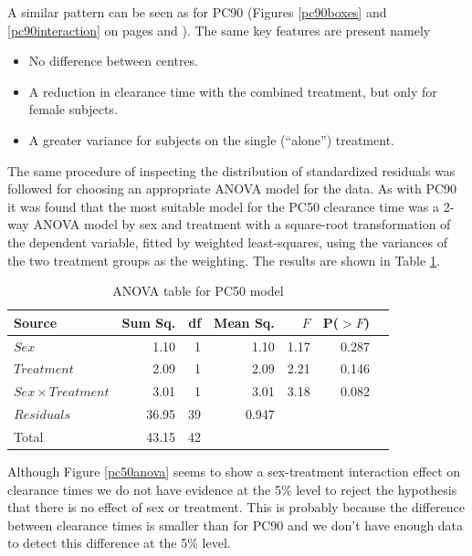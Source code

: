 A similar pattern can be seen as for PC90 (Figures \ref{pc90boxes} and \ref{pc90interaction} on pages \pageref{pc90boxes} and \pageref{pc90interaction}). The same key features are present namely
\begin{itemize}
\item No difference between centres.
\item A reduction in clearance time with the combined treatment, but only for female subjects.
\item A greater variance for subjects on the single (``alone'') treatment.
\end{itemize}

The same procedure of inspecting the distribution of standardized residuals was followed for choosing an appropriate ANOVA model for the data. As with PC90 it was found that the most suitable model for the PC50 clearance time was a 2-way ANOVA model by sex and treatment with a square-root transformation of the dependent variable, fitted by weighted least-squares, using the variances of the two treatment groups as the weighting. The results are shown in Table \ref{aov50}.
\begin{table}[h]
\centering
\caption{ANOVA table for PC50 model}\label{aov50}
\begin{tabular}{l|rrrrrl}
Source&Sum Sq.&df&Mean Sq.&$F$&P($>F$)\\
\hline
$Sex$				& 1.10 & 1 & 1.10 & 1.17 & 0.287 & \\
$Treatment$			& 2.09   & 1 & 2.09   & 2.21   & 0.146 & \\
$Sex\times Treatment$	& 3.01   & 1 & 3.01   & 3.18   & 0.082 & \\
$Residuals$			& 36.95 & 39 & 0.947 &&&\\
\hline
Total&43.15&42&&&
\end{tabular}
\end{table}

Although Figure \ref{pc50anova} seems to show a sex-treatment interaction effect on clearance times we do not have evidence at the 5\% level to reject the hypothesis that there is no effect of sex or treatment. This is probably because the difference between clearance times is smaller than for PC90 and we don't have enough data to detect this difference at the 5\% level.

